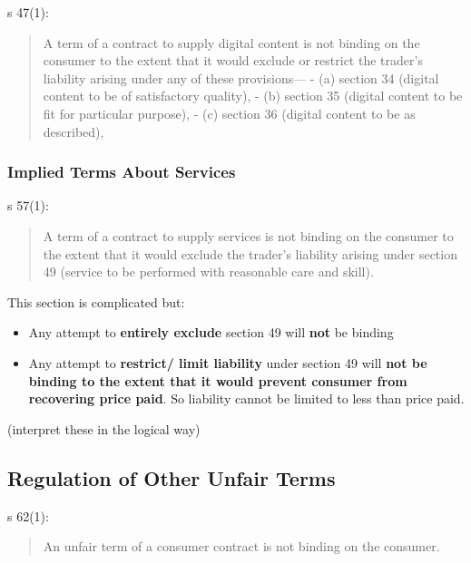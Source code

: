 \documentclass[
]{article}
\providecommand{\tightlist}{%
  \setlength{\itemsep}{0pt}\setlength{\parskip}{0pt}}
\begin{document}
s 47(1):

\begin{quote}
A term of a contract to supply digital content is not binding on the
consumer to the extent that it would exclude or restrict the trader's
liability arising under any of these provisions--- - (a) section 34
(digital content to be of satisfactory quality), - (b) section 35
(digital content to be fit for particular purpose), - (c) section 36
(digital content to be as described),
\end{quote}

\hypertarget{implied-terms-about-services}{%
\subsubsection{Implied Terms About
Services}\label{implied-terms-about-services}}

s 57(1):

\begin{quote}
A term of a contract to supply services is not binding on the consumer
to the extent that it would exclude the trader's liability arising under
section 49 (service to be performed with reasonable care and skill).
\end{quote}

This section is complicated but:

\begin{itemize}
\tightlist
\item
  Any attempt to \textbf{entirely exclude} section 49 will \textbf{not}
  be binding
\item
  Any attempt to \textbf{restrict/ limit liability} under section 49
  will \textbf{not be binding to the extent that it would prevent
  consumer from recovering price paid}. So liability cannot be limited
  to less than price paid.
\end{itemize}

(interpret these in the logical way)

\hypertarget{regulation-of-other-unfair-terms}{%
\subsection{Regulation of Other Unfair
Terms}\label{regulation-of-other-unfair-terms}}

s 62(1):

\begin{quote}
An unfair term of a consumer contract is not binding on the consumer.
\end{quote}
\end{document}
